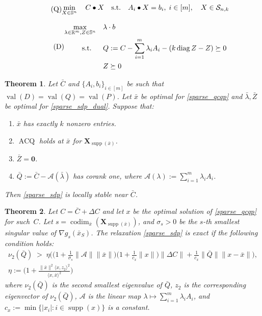 \documentclass[10pt,a4paper]{amsart}
\newtheorem{thm}{Theorem}
\DeclareMathOperator{\ACQ}{ACQ}
\newcommand{\RR}{\mathbb{R}}
\renewcommand{\SS}{{\mathbb{S}}}
\newcommand{\Szero}[2]{\ensuremath{\mathcal{S}_{#1,#2}}}
\newcommand{\cA}{{\mathcal{A}}}
\DeclareMathOperator{\codim}{codim}
\DeclareMathOperator{\diag}{diag}
\newcommand{\st}{\text{\, s.t.\, }}
\DeclareMathOperator{\supp}{supp}
\newcommand{\vX}{{\mathbf{X}}}
\DeclareMathOperator{\val}{val}
\newcommand{\vzero}{\mathbf{0}}
\begin{document}
	\begin{equation}\label{sparse_sdp}\tag{\small{Q}}
		\begin{aligned}
			\min_{X \in \mathbb{S}^n}\quad C \bullet X
			\quad\text{s.t.}\quad A_i \bullet X = b_i,\;  i \in [m],\quad
			X\in \Szero{n}{k}
		\end{aligned}
	\end{equation}

	\begin{equation}\label{sparse_sdp_dual}\tag{\small{D}}
		\begin{aligned}
			\max_{\lambda\in \RR^m, Z\in \SS^n}\quad & \lambda \cdot b  \\
			\st\quad &  Q:=C -  \sum_{i=1}^m \lambda_i A_i - (k \diag Z - Z) \succeq 0\\
			& Z \succeq 0
		\end{aligned}
	\end{equation}

	\begin{thm}\label{thm:sparse_local_stability}
		Let \(\bar C\) and \(\{A_i, b_i\}_{i\in [m]}\) be such that \(\val(D) = \val(Q) = \val(P)\).
		Let $\bar x$ be optimal for \eqref{sparse_qcqp}
		and $\bar\lambda,\bar Z$ be optimal for \eqref{sparse_sdp_dual}.
		Suppose that:
		\begin{enumerate}[label=(\alph*)]
			\item $\bar x$ has exactly $k$ nonzero entries.
			\item $\ACQ$ holds at $\bar x$ for $\vX_{\supp (\bar x)}$.
			\item $\bar Z = \vzero$. 
			\item $\bar Q:= \bar C - \cA(\bar\lambda)$ has corank one, where \(\cA(\lambda):= \sum_{i=1}^m \lambda_i A_i\).
		\end{enumerate}
		Then \eqref{sparse_sdp} is locally stable near $\bar C$.
	\end{thm}

	\begin{thm}\label{thm:general_exact_region}
		Let $C = \bar C + \Delta C$ and let $x$ be the optimal solution of \eqref{sparse_qcqp} for such~$C$. Let  $s=\codim_{\bar x}(\vX_{\supp(\bar x)})$, and $\sigma_s > 0$ be the $s$-th smallest singular value of \(\nabla g_s(\bar x_S)\). The relaxation \eqref{sparse_sdp} is exact if the following condition holds:
		\begin{equation}\label{eq:exact_region}
			\begin{gathered}
				\nu_2(\bar Q) \;>\;
				\eta \Big(
				\big(1
				+\frac{1}{\sigma_s}\|\cA\|\|\bar x \|\big)\big(1 + \frac{1}{c_{ x}}\| x\|\big)\|\Delta C\|
				+ \frac{1}{c_{ x}}\|\bar Q\|\| x- \bar x\|
				\Big),
				\\
				\eta := \Big(1 + \frac{\|\bar x\|^2\langle  x,z_2\rangle^2}{\langle x, \bar x\rangle^2}\Big)
			\end{gathered}
		\end{equation}
		where $\nu_2(\bar Q)$ is the second smallest eigenvalue of $\bar Q$, $z_2$ is the corresponding eigenvector of $\nu_2(\bar Q)$, \(\cA\) is the linear map \( \lambda \mapsto \sum_{i=1}^m\lambda_iA_i\), and $c_{x}:= \min\{|x_i|: i \in \supp(x)\}$ is a constant. 
	\end{thm}
\end{document}
